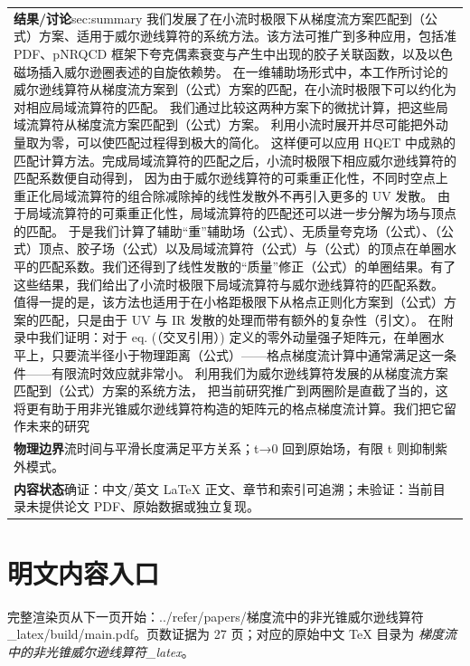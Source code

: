 \documentclass[UTF8,11pt,oneside]{ctexbook}
\begin{document}
\begin{table}[htbp]
\begin{tabular}{@{}p{}@{}}
    \textbf{结果/讨论}\quad sec:summary 我们发展了在小流时极限下从梯度流方案匹配到（公式）方案、适用于威尔逊线算符的系统方法。该方法可推广到多种应用，包括准PDF、pNRQCD 框架下夸克偶素衰变与产生中出现的胶子关联函数，以及以色磁场插入威尔逊圈表述的自旋依赖势。 在一维辅助场形式中，本工作所讨论的威尔逊线算符从梯度流方案到（公式）方案的匹配，在小流时极限下可以约化为对相应局域流算符的匹配。 我们通过比较这两种方案下的微扰计算，把这些局域流算符从梯度流方案匹配到（公式）方案。 利用小流时展开并尽可能把外动量取为零，可以使匹配过程得到极大的简化。 这样便可以应用 HQET 中成熟的匹配计算方法。完成局域流算符的匹配之后，小流时极限下相应威尔逊线算符的匹配系数便自动得到， 因为由于威尔逊线算符的可乘重正化性，不同时空点上重正化局域流算符的组合除减除掉的线性发散外不再引入更多的 UV 发散。 由于局域流算符的可乘重正化性，局域流算符的匹配还可以进一步分解为场与顶点的匹配。 于是我们计算了辅助``重''辅助场（公式）、无质量夸克场（公式）、（公式）顶点、胶子场（公式）以及局域流算符（公式）与（公式）的顶点在单圈水平的匹配系数。我们还得到了线性发散的``质量''修正（公式）的单圈结果。有了这些结果，我们给出了小流时极限下局域流算符与威尔逊线算符的匹配系数。 值得一提的是，该方法也适用于在小格距极限下从格点正则化方案到（公式）方案的匹配，只是由于 UV 与 IR 发散的处理而带有额外的复杂性（引文）。 在附录中我们证明：对于 eq. (（交叉引用）) 定义的零外动量强子矩阵元，在单圈水平上，只要流半径小于物理距离（公式）——格点梯度流计算中通常满足这一条件——有限流时效应就非常小。 利用我们为威尔逊线算符发展的从梯度流方案匹配到（公式）方案的系统方法， 把当前研究推广到两圈阶是直截了当的，这将更有助于用非光锥威尔逊线算符构造的矩阵元的格点梯度流计算。我们把它留作未来的研究 \\
    \textbf{物理边界}\quad 流时间与平滑长度满足平方关系；t→0 回到原始场，有限 t 则抑制紫外模式。 \\
    \textbf{内容状态}\quad 确证：中文/英文 LaTeX 正文、章节和索引可追溯；未验证：当前目录未提供论文 PDF、原始数据或独立复现。 \\
    \bottomrule
  \end{tabular}
\end{table}
\section*{明文内容入口}
\noindent 完整渲染页从下一页开始：../\allowbreak{}refer/\allowbreak{}papers/\allowbreak{}梯度流中的非光锥威尔逊线算符\_\allowbreak{}latex/\allowbreak{}build/\allowbreak{}main.pdf。页数证据为 27 页；对应的原始中文 TeX 目录为 \emph{梯度流中的非光锥威尔逊线算符\_latex}。
\clearpage

\clearpage
\end{document}
